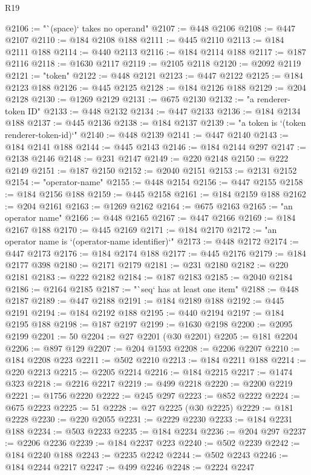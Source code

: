 \begin{lexlean}{R19}
\begin{coremodule}
@2106 := "`(space)` takes no operand"
@2107 := @448 @2106
@2108 := @447 @2107
@2110 := @184 @2108 @188
@2111 := @445 @2110
@2113 := @184 @2111 @188
@2114 := @440 @2113
@2116 := @184 @2114 @188
@2117 := @187 @2116
@2118 := @1630 @2117
@2119 := @2105 @2118
@2120 := @2092 @2119
@2121 := "token"
@2122 := @448 @2121
@2123 := @447 @2122
@2125 := @184 @2123 @188
@2126 := @445 @2125
@2128 := @184 @2126 @188
@2129 := @204 @2128
@2130 := @1269 @2129
@2131 := @675 @2130
@2132 := "a renderer-token ID"
@2133 := @448 @2132
@2134 := @447 @2133
@2136 := @184 @2134 @188
@2137 := @445 @2136
@2138 := @184 @2137
@2139 := "a token is `(token renderer-token-id)`"
@2140 := @448 @2139
@2141 := @447 @2140
@2143 := @184 @2141 @188
@2144 := @445 @2143
@2146 := @184 @2144 @297
@2147 := @2138 @2146
@2148 := @231 @2147
@2149 := @220 @2148
@2150 := @222 @2149
@2151 := @187 @2150
@2152 := @2040 @2151
@2153 := @2131 @2152
@2154 := "operator-name"
@2155 := @448 @2154
@2156 := @447 @2155
@2158 := @184 @2156 @188
@2159 := @445 @2158
@2161 := @184 @2159 @188
@2162 := @204 @2161
@2163 := @1269 @2162
@2164 := @675 @2163
@2165 := "an operator name"
@2166 := @448 @2165
@2167 := @447 @2166
@2169 := @184 @2167 @188
@2170 := @445 @2169
@2171 := @184 @2170
@2172 := "an operator name is `(operator-name identifier)`"
@2173 := @448 @2172
@2174 := @447 @2173
@2176 := @184 @2174 @188
@2177 := @445 @2176
@2179 := @184 @2177 @398
@2180 := @2171 @2179
@2181 := @231 @2180
@2182 := @220 @2181
@2183 := @222 @2182
@2184 := @187 @2183
@2185 := @2040 @2184
@2186 := @2164 @2185
@2187 := "`seq` has at least one item"
@2188 := @448 @2187
@2189 := @447 @2188
@2191 := @184 @2189 @188
@2192 := @445 @2191
@2194 := @184 @2192 @188
@2195 := @440 @2194
@2197 := @184 @2195 @188
@2198 := @187 @2197
@2199 := @1630 @2198
@2200 := @2095 @2199
@2201 := 50
@2204 := @27 @2201 (@30 @2201)
@2205 := @181 @2204
@2206 := @897 @129
@2207 := @204 @1593
@2208 := @2206 @2207
@2210 := @184 @2208 @223
@2211 := @502 @2210
@2213 := @184 @2211 @188
@2214 := @220 @2213
@2215 := @2205 @2214
@2216 := @184 @2215
@2217 := @1474 @323
@2218 := @2216 @2217
@2219 := @499 @2218
@2220 := @2200 @2219
@2221 := @1756 @2220
@2222 := @245 @297
@2223 := @852 @2222
@2224 := @675 @2223
@2225 := 51
@2228 := @27 @2225 (@30 @2225)
@2229 := @181 @2228
@2230 := @220 @2055
@2231 := @2229 @2230
@2233 := @184 @2231 @188
@2234 := @503 @2233
@2235 := @184 @2234
@2236 := @204 @297
@2237 := @2206 @2236
@2239 := @184 @2237 @223
@2240 := @502 @2239
@2242 := @184 @2240 @188
@2243 := @2235 @2242
@2244 := @502 @2243
@2246 := @184 @2244 @2217
@2247 := @499 @2246
@2248 := @2224 @2247

\end{coremodule}
\end{lexlean}

